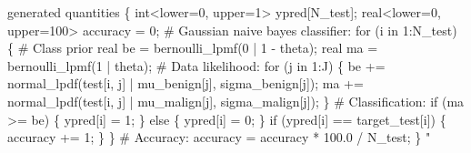 \documentclass[
]{article}
\newenvironment{Shaded}{\begin{snugshade}}{\end{snugshade}}
\newcommand{\StringTok}[1]{\textcolor[rgb]{0.31,0.60,0.02}{#1}}
\begin{document}
\begin{Shaded}
\begin{Highlighting}[]
\StringTok{generated quantities \{}
\StringTok{  int\textless{}lower=0, upper=1\textgreater{} ypred[N\_test];}
\StringTok{  real\textless{}lower=0, upper=100\textgreater{} accuracy = 0;}
\StringTok{  }
\StringTok{  \# Gaussian naive bayes classifier:}
\StringTok{  for (i in 1:N\_test) \{}
\StringTok{    \# Class prior}
\StringTok{    real be = bernoulli\_lpmf(0 | 1 {-} theta);}
\StringTok{    real ma = bernoulli\_lpmf(1 | theta);}
\StringTok{    \# Data likelihood:}
\StringTok{    for (j in 1:J) \{}
\StringTok{      be += normal\_lpdf(test[i, j] | mu\_benign[j], sigma\_benign[j]);}
\StringTok{      ma += normal\_lpdf(test[i, j] | mu\_malign[j], sigma\_malign[j]);}
\StringTok{    \}}
\StringTok{    \# Classification:}
\StringTok{    if (ma \textgreater{}= be) \{}
\StringTok{      ypred[i] = 1;}
\StringTok{    \}}
\StringTok{    else \{}
\StringTok{      ypred[i] = 0;}
\StringTok{    \}}
\StringTok{    if (ypred[i] == target\_test[i]) \{}
\StringTok{      accuracy += 1;}
\StringTok{    \}}
\StringTok{  \}}
\StringTok{  \# Accuracy:}
\StringTok{  accuracy = accuracy * 100.0 / N\_test;}
\StringTok{\}}
\StringTok{"}
\end{Highlighting}
\end{Shaded}
\end{document}

